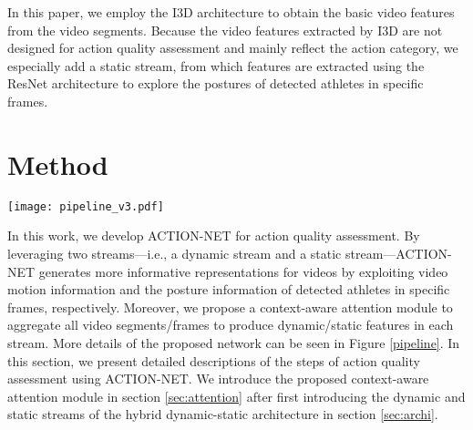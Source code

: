 \documentclass[sigconf]{acmart}
\begin{document}
In this paper, we employ the I3D architecture \cite{carreira2017quo} to obtain the basic video features from the video segments. Because the video features extracted by I3D are not designed for action quality assessment and mainly reflect the action category, we especially add a static stream, from which features are extracted using the ResNet architecture \cite{he2016deep} to explore the postures of detected athletes in specific frames.


\section{Method}

\begin{figure*}[ht]
 \centering
 \texttt{[image: pipeline\_v3.pdf]}
\vspace{-0.3cm}
\caption{\textbf{The pipeline of our ACTION-NET.} Based on the dynamic stream, motion information and background information are extracted from video segments. The static stream provides spatial information about the postures and appearance of detected athletes in specific frames. Both streams are fed into ACTION-NET branches with identical structures, but these branches do not share parameters. The proposed context-aware attention module learns the relations between all segments/frames and generates dynamic/static features by aggregating the fused local-context features of all segments/frames. Finally, we concatenate the features from both streams and feed them into the score prediction module.}
 \label{pipeline}
\vspace{-0.3cm}
\end{figure*}


In this work, we develop ACTION-NET for action quality assessment. By leveraging two streams---i.e., a dynamic stream and a static stream---ACTION-NET generates more informative representations for videos by exploiting video motion information and the posture information of detected athletes in specific frames, respectively. Moreover, we propose a context-aware attention module to aggregate all video segments/frames to produce dynamic/static features in each stream. More details of the proposed network can be seen in Figure \ref{pipeline}. In this section, we present detailed descriptions of the steps of action quality assessment using ACTION-NET. We introduce the proposed context-aware attention module in section \ref{sec:attention} after first introducing the dynamic and static streams of the hybrid dynamic-static architecture in section \ref{sec:archi}.
\end{document}
